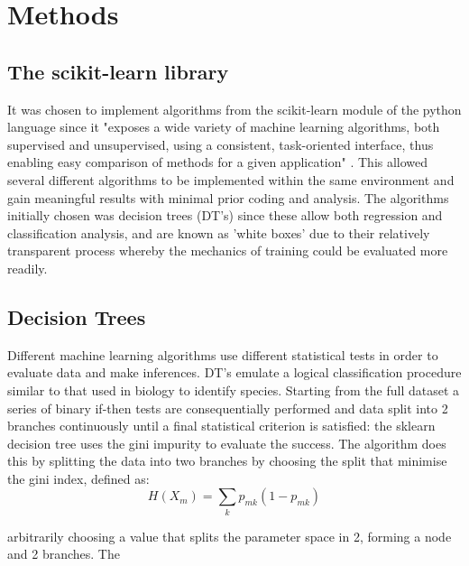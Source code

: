\chapter{Methods}
\label{ch:methods}
\section{The scikit-learn library}It was chosen to implement algorithms from the scikit-learn module of the python language since it "exposes a wide variety of machine learning algorithms, both supervised and unsupervised, using a consistent, task-oriented interface, thus enabling easy comparison of methods for a given application" \cite{Pedregosa2012}. This allowed several different algorithms to be implemented within the same environment and gain meaningful results with minimal prior coding and analysis. The algorithms initially chosen was decision trees (DT's) since these allow both regression and classification analysis, and are known as 'white boxes' due to their relatively transparent process whereby the mechanics of training could be evaluated more readily. 

\section{Decision Trees}
Different machine learning algorithms use different statistical tests in order to evaluate data and make inferences. DT's emulate a logical classification procedure similar to that used in biology to identify species. Starting from the full dataset a series of binary if-then tests are consequentially performed and data split into 2 branches continuously until a final statistical criterion is satisfied: the sklearn decision tree uses the gini impurity to evaluate the success. The algorithm does this by splitting the data into two branches by choosing the split that minimise the gini index, defined as:
\begin{equation}
H(X_m) = \sum_k p_{mk} (1 - p_{mk})
\end{equation}

 arbitrarily choosing a value that splits the parameter space in 2, forming a node and 2 branches. The 

